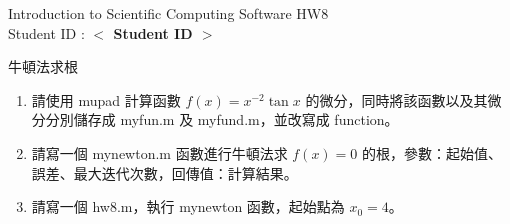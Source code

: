 \documentclass[12pt,a4paper]{article}
\newcommand{\placeholder}[1]{\textbf{$<$ #1 $>$}}
\newcommand{\idnumber}{\placeholder{Student ID}}
\begin{document}
\begin{CJK}{UTF8}{bsmi}
\begin{flushleft}Introduction to Scientific Computing Software HW8
\\Student ID : \idnumber{}\end{flushleft}

牛頓法求根
\begin{enumerate}
\item 請使用 mupad 計算函數 $f(x)=x^{-2}\tan x$ 的微分，同時將該函數以及其微分分別儲存成 myfun.m 及 myfund.m，並改寫成 function。
\item 請寫一個 mynewton.m 函數進行牛頓法求 $f(x)=0$ 的根，參數：起始值、誤差、最大迭代次數，回傳值：計算結果。
\item 請寫一個 hw8.m，執行 mynewton 函數，起始點為 $x_0=4$。

\end{enumerate}
\end{CJK}
\end{document}
